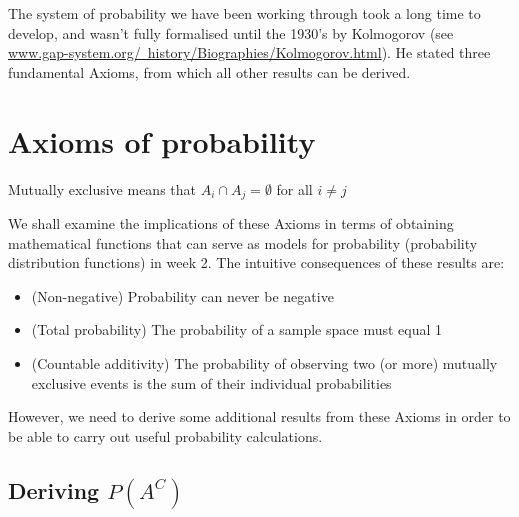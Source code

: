 \documentclass[12pt]{extbook}
\begin{document}
The system of probability we have been working through took a long time to develop, and wasn't fully formalised until the 1930's by Kolmogorov (see 
\href{http://www.gap-system.org/~history/Biographies/Kolmogorov.html}{\color{blue}www.gap-system.org/~history/Biographies/Kolmogorov.html}).   He stated three fundamental Axioms, from which all other results can be derived.



\section{Axioms of probability}


Mutually exclusive means that $A_i \cap A_j = \emptyset$ for all $i \neq j$


We shall examine the implications of these Axioms in terms of obtaining mathematical functions that can serve as models for probability (probability distribution functions) in week 2.   The intuitive consequences of these results are:

\begin{itemize}
\item (Non-negative) Probability can never be negative
\item (Total probability) The probability of a sample space must equal 1 
\item (Countable additivity) The probability of observing two (or more) mutually exclusive events is the sum of their individual probabilities
\end{itemize}

However, we need to derive some additional results from these Axioms in order to be able to carry out useful probability calculations.



\subsection{Deriving $P(A^C)$}
\end{document}

